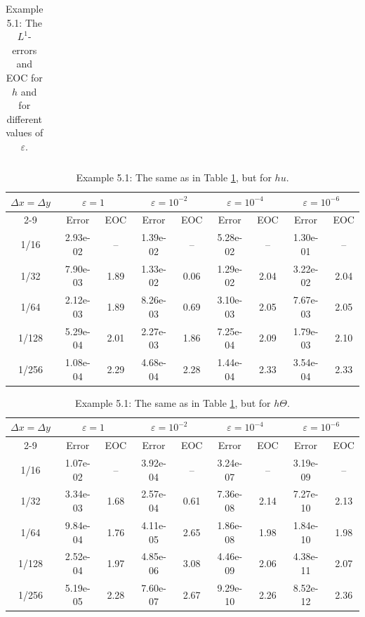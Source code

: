 \documentclass[a4paper,11pt,twoside]{article}
\numberwithin{equation}{section}
\numberwithin{figure}{section}
\numberwithin{table}{section}
\newcommand{\eps}{\varepsilon}
\newcommand{\dx}{\Delta x}
\newcommand{\dy}{\Delta y}
\begin{document}
\begin{example}
\begin{table}[ht!]
\begin{tabular}{|c|cc|cc|cc|cc|}
\hline
\end{tabular}
\caption{\sf Example 5.1: The $L^1$-errors and EOC for $h$ and for different values of $\eps$.\label{tab51}}
\end{table}
\begin{table}[ht!]
\centering
\begin{tabular}{|c|cc|cc|cc|cc|}
\hline
\multirow{2}{*}{$\dx=\dy$}&\multicolumn{2}{c|}{$\eps=1$}&\multicolumn{2}{c|}{$\eps=10^{-2}$}&\multicolumn{2}{c|}{$\eps=10^{-4}$}
& \multicolumn{2}{c|}{$\eps = 10^{-6}$} \\ 
\cline{2-9}
&Error&EOC&Error&EOC&Error&EOC&Error&EOC\\
\hline  		           
1/16 &2.93e-02& -- &1.39e-02& -- &5.28e-02& -- &1.30e-01& -- \\   
1/32 &7.90e-03&1.89&1.33e-02&0.06&1.29e-02&2.04&3.22e-02&2.04\\          
1/64 &2.12e-03&1.89&8.26e-03&0.69&3.10e-03&2.05&7.67e-03&2.05\\          
1/128&5.29e-04&2.01&2.27e-03&1.86&7.25e-04&2.09&1.79e-03&2.10\\
1/256&1.08e-04&2.29&4.68e-04&2.28&1.44e-04&2.33&3.54e-04&2.33\\
\hline
\end{tabular}
\caption{\sf Example 5.1: The same as in Table \ref{tab51}, but for $hu$.\label{tab52}}
\end{table}
\begin{table}[ht!]
\centering
\begin{tabular}{|c|cc|cc|cc|cc|}
\hline
\multirow{2}{*}{$\dx=\dy$}&\multicolumn{2}{c|}{$\eps=1$}&\multicolumn{2}{c|}{$\eps=10^{-2}$}&\multicolumn{2}{c|}{$\eps=10^{-4}$}
&\multicolumn{2}{c|}{$\eps=10^{-6}$} \\ 
\cline{2-9}
&Error&EOC&Error&EOC&Error&EOC&Error&EOC\\
\hline 		           
1/16 &1.07e-02& -- &3.92e-04& -- &3.24e-07& -- &3.19e-09& -- \\   
1/32 &3.34e-03&1.68&2.57e-04&0.61&7.36e-08&2.14&7.27e-10&2.13\\          
1/64 &9.84e-04&1.76&4.11e-05&2.65&1.86e-08&1.98&1.84e-10&1.98\\          
1/128&2.52e-04&1.97&4.85e-06&3.08&4.46e-09&2.06&4.38e-11&2.07\\
1/256&5.19e-05&2.28&7.60e-07&2.67&9.29e-10&2.26&8.52e-12&2.36\\
\hline
\end{tabular}
\caption{\sf Example 5.1: The same as in Table \ref{tab51}, but for $h\Theta$.\label{tab53}}
\end{table}	
\end{example}
\end{document}
